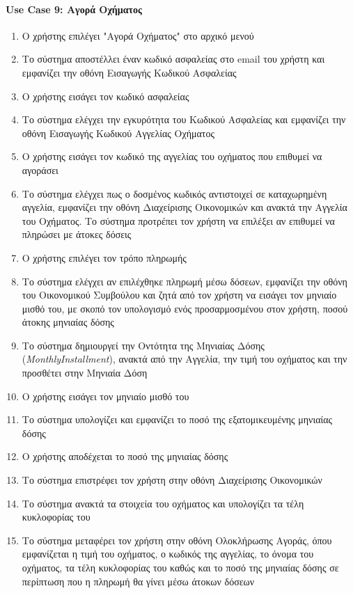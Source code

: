 \documentclass{../ol-softwaremanual}
\begin{document}
	
	
	\newpage
	\centering
	
	\paragraph{\en Use Case 9: \gr Αγορά Οχήματος\gr}
	
	\begin{enumerate}
		\item Ο χρήστης επιλέγει \en"\gr Αγορά Οχήματος\en" \gr στο αρχικό μενού
		\item Το σύστημα αποστέλλει έναν κωδικό ασφαλείας στο \en email \gr του χρήστη και εμφανίζει την οθόνη Εισαγωγής Κωδικού Ασφαλείας
		\item Ο χρήστης εισάγει τον κωδικό ασφαλείας		
		\item Το σύστημα ελέγχει την εγκυρότητα του Κωδικού Ασφαλείας και εμφανίζει την οθόνη Εισαγωγής Κωδικού Αγγελίας Οχήματος
		\item Ο χρήστης εισάγει τον κωδικό της αγγελίας	του οχήματος που επιθυμεί να αγοράσει
		\item Το σύστημα ελέγχει πως ο δοσμένος κωδικός αντιστοιχεί σε καταχωρημένη αγγελία, εμφανίζει την οθόνη Διαχείρισης Οικονομικών και ανακτά την Αγγελία του Οχήματος. Το σύστημα προτρέπει τον χρήστη να επιλέξει αν επιθυμεί να πληρώσει με άτοκες δόσεις
		\item Ο χρήστης επιλέγει τον τρόπο πληρωμής
		\item Το σύστημα ελέγχει αν επιλέχθηκε πληρωμή μέσω δόσεων, εμφανίζει την οθόνη του Οικονομικού Συμβούλου και ζητά από τον χρήστη να εισάγει τον μηνιαίο μισθό του, με σκοπό τον υπολογισμό ενός προσαρμοσμένου στον χρήστη, ποσού άτοκης μηνιαίας δόσης
		\item Το σύστημα δημιουργεί την Οντότητα της Μηνιαίας Δόσης (\en \textit{MonthlyInstallment}\gr), ανακτά από την Αγγελία, την τιμή του οχήματος και την προσθέτει στην Μηνιαία Δόση	
		\item Ο χρήστης εισάγει τον μηνιαίο μισθό του
		\item Το σύστημα υπολογίζει και εμφανίζει το ποσό της εξατομικευμένης μηνιαίας δόσης
		\item Ο χρήστης αποδέχεται το ποσό της μηνιαίας δόσης
		\item Το σύστημα επιστρέφει τον χρήστη στην οθόνη Διαχείρισης Οικονομικών
		\item Το σύστημα ανακτά τα στοιχεία του οχήματος και υπολογίζει τα τέλη κυκλοφορίας του
		\item Το σύστημα μεταφέρει τον χρήστη στην οθόνη Ολοκλήρωσης Αγοράς, όπου εμφανίζεται η τιμή του οχήματος, ο κωδικός της αγγελίας, το όνομα του οχήματος, τα τέλη κυκλοφορίας του καθώς και το ποσό της μηνιαίας δόσης σε περίπτωση που η πληρωμή θα γίνει μέσω άτοκων δόσεων

\end{enumerate}
\end{document}
